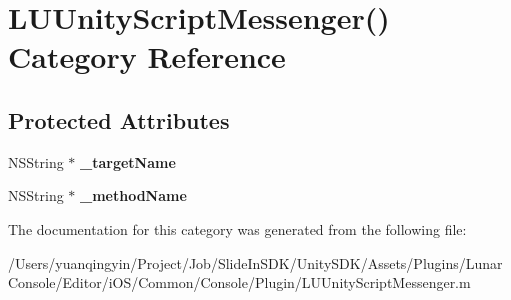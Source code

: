 \hypertarget{category_l_u_unity_script_messenger_07_08}{}\section{L\+U\+Unity\+Script\+Messenger() Category Reference}
\label{category_l_u_unity_script_messenger_07_08}
\subsection*{Protected Attributes}
\begin{DoxyCompactItemize}
\item 
\mbox{\label{category_l_u_unity_script_messenger_07_08_a2205ad5d451fbd703cd7efad5f6522eb}} 
N\+S\+String $\ast$ {\bfseries \+\_\+target\+Name}
\item 
\mbox{\label{category_l_u_unity_script_messenger_07_08_af5a0235a6645923111734591cba473a0}} 
N\+S\+String $\ast$ {\bfseries \+\_\+method\+Name}
\end{DoxyCompactItemize}


The documentation for this category was generated from the following file\+:\begin{DoxyCompactItemize}
\item 
/\+Users/yuanqingyin/\+Project/\+Job/\+Slide\+In\+S\+D\+K/\+Unity\+S\+D\+K/\+Assets/\+Plugins/\+Lunar\+Console/\+Editor/i\+O\+S/\+Common/\+Console/\+Plugin/L\+U\+Unity\+Script\+Messenger.\+m\end{DoxyCompactItemize}
